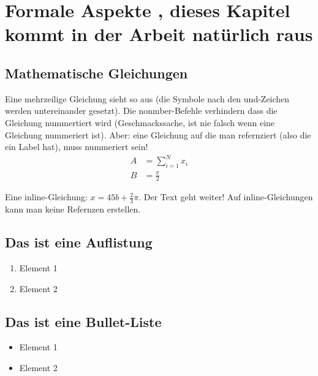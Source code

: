 
\section{Formale Aspekte , dieses Kapitel kommt in der Arbeit natürlich raus}
%
\subsection{Mathematische Gleichungen}
Eine mehrzeilige Gleichung sieht so aus (die Symbole nach den und-Zeichen werden untereinander gesetzt). Die nonmber-Befehle verhindern dass die Gleichung nummertiert wird (Geschmackssache, ist nie falsch wenn eine Gleichung nummeriert ist). Aber: eine Gleichung auf die man refernziert (also die ein Label hat), muss nummeriert sein!
\begin{align}
    A &= \sum_{i=1}^N x_i \label{eq:1}\nonumber\\
    B &= \frac{\pi}{2}
\end{align}

Eine inline-Gleichung: $x=45b + \frac{2}{3}\pi$. Der Text geht weiter! Auf inline-Gleichungen kann man keine Refernzen erstellen.

\subsection{Das ist eine Auflistung}
\begin{enumerate}
\item Element 1
\item Element 2
\end{enumerate}

\subsection{Das ist eine Bullet-Liste}
\begin{itemize}
\item Element 1
\item Element 2
\end{itemize}

